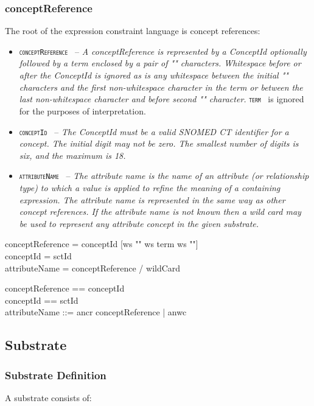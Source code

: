 \documentclass{article}
\def\spec#1{{\tt \small \textsc{{#1}} }}
\def\bnf#1{{\scriptsize {{#1}} }}
\def\desc#1{{\small \textsl{{#1}} }}
\begin{document}
\subsubsection{conceptReference}
The root of the expression constraint language is concept references:
\begin{itemize}
\item \spec{conceptReference} -- \desc{A conceptReference is represented by a ConceptId optionally followed by a term enclosed by a pair of "\textbar" characters. Whitespace before or after the ConceptId is ignored as is any whitespace between the initial "\textbar" characters and the first non-whitespace character in the term or between the last non-whitespace character and before second "\textbar" character.} \spec{term} is ignored for the purposes of interpretation.  
\item \spec{conceptId} -- \desc{The ConceptId must be a valid SNOMED CT identifier for a concept. The initial digit may not be zero. The smallest number of digits is six, and the maximum is 18.}
\item \spec{attributeName} -- \desc{The attribute name is the name of an attribute (or relationship type) to which a value is applied to refine the meaning of a containing expression. The attribute name is represented in the same way as other concept references. If the attribute name is not known then a wild card may be used to represent any attribute concept in the given substrate.}
\end{itemize}
\begin{framed}
\noindent
\bnf{conceptReference = conceptId [ws "\textbar" ws term ws "\textbar"]} \\
\bnf{conceptId = sctId} \\
\bnf{attributeName = conceptReference / wildCard}
\end{framed}

\begin{zed}
conceptReference == conceptId \cross \optional[term] \\
conceptId == sctId \\
attributeName ::= ancr \ldata conceptReference \rdata | anwc
\end{zed}

\subsection{Substrate}
\subsubsection{Substrate Definition}
A substrate consists of:
\end{document}
